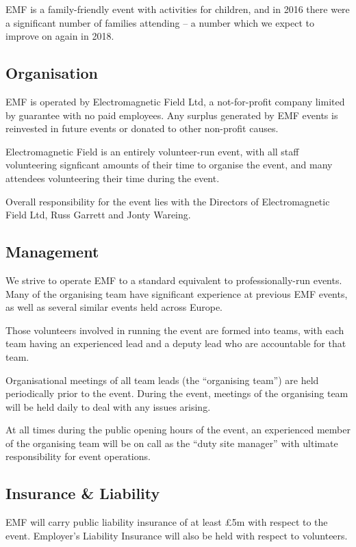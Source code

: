 EMF is a family-friendly event with activities for children, and in 2016 there
were a significant number of families attending -- a number which we expect to
improve on again in 2018.

\subsection{Organisation}
EMF is operated by Electromagnetic Field Ltd, a not-for-profit company
limited by guarantee with no paid employees. Any surplus generated by
EMF events is reinvested in future events or donated to other non-profit causes.

Electromagnetic Field is an entirely volunteer-run event, with all staff
volunteering signficant amounts of their time to organise the event, and many
attendees volunteering their time during the event.

Overall responsibility for the event lies with the Directors
of Electromagnetic Field Ltd, Russ Garrett and Jonty Wareing.

\subsection{Management}
We strive to operate EMF to a standard equivalent to professionally-run events.
Many of the organising team have significant experience at previous EMF events,
as well as several similar events held across Europe.

Those volunteers involved in running the event are formed into teams, with each
team having an experienced lead and a deputy lead who are accountable for that
team.

Organisational meetings of all team leads (the ``organising team'') are held
periodically prior to the event.  During the event, meetings of the organising
team will be held daily to deal with any issues arising.

At all times during the public opening hours of the event, an experienced member
of the organising team will be on call as the ``duty site manager'' with
ultimate responsibility for event operations.

\subsection{Insurance \& Liability}

EMF will carry public liability insurance of at least £5m with respect to the event.
Employer's Liability Insurance will also be held with respect to volunteers.

